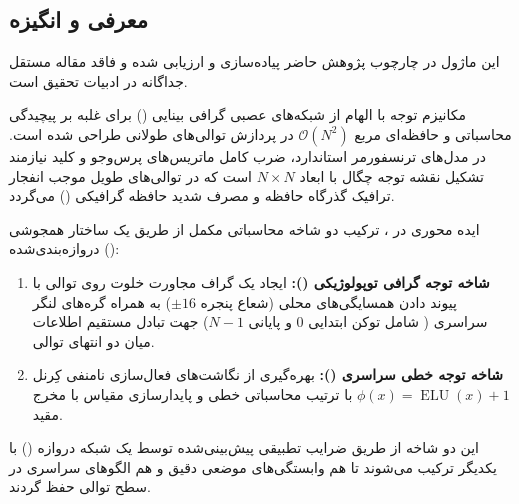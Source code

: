\subsection{معرفی و انگیزه}
این ماژول در چارچوب پژوهش حاضر پیاده‌سازی و ارزیابی شده و فاقد مقاله مستقل جداگانه در ادبیات تحقیق است.

مکانیزم توجه  با الهام از شبکه‌های عصبی گرافی بینایی () برای غلبه بر پیچیدگی محاسباتی و حافظه‌ای مربع $\mathcal{O}(N^2)$ در پردازش توالی‌های طولانی طراحی شده است. در مدل‌های ترنسفورمر استاندارد، ضرب کامل ماتریس‌های پرس‌وجو و کلید نیازمند تشکیل نقشه توجه چگال با ابعاد $N \times N$ است که در توالی‌های طویل موجب انفجار ترافیک گذرگاه حافظه و مصرف شدید حافظه گرافیکی () می‌گردد.

ایده محوری در ، ترکیب دو شاخه محاسباتی مکمل از طریق یک ساختار همجوشی دروازه‌بندی‌شده ():
\begin{enumerate}
    \item \textbf{شاخه توجه گرافی توپولوژیکی ():} ایجاد یک گراف مجاورت خلوت روی توالی با پیوند دادن همسایگی‌های محلی (شعاع پنجره $\pm 16$) به همراه گره‌های لنگر سراسری ( شامل توکن ابتدایی $0$ و پایانی $N-1$) جهت تبادل مستقیم اطلاعات میان دو انتهای توالی.
    \item \textbf{شاخه توجه خطی سراسری ():} بهره‌گیری از نگاشت‌های فعال‌سازی نامنفی کِرنل $\phi(x) = \operatorname{ELU}(x) + 1$ با ترتیب محاسباتی خطی و پایدارسازی مقیاس با مخرج مقید.
\end{enumerate}
این دو شاخه از طریق ضرایب تطبیقی پیش‌بینی‌شده توسط یک شبکه دروازه () با یکدیگر ترکیب می‌شوند تا هم وابستگی‌های موضعی دقیق و هم الگوهای سراسری در سطح توالی حفظ گردند.
